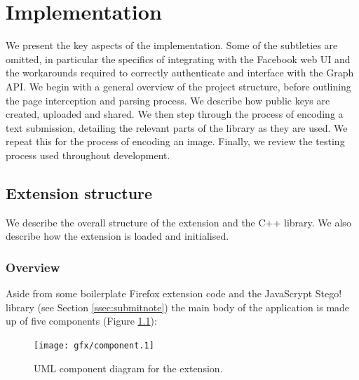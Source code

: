 \chapter{Implementation}\label{ch:implementation}
\label{imp}

We present the key aspects of the implementation. Some of the subtleties are omitted, in particular the specifics of integrating with the Facebook web UI and the workarounds required to correctly authenticate and interface with the Graph API. We begin with a general overview of the project structure, before outlining the page interception and parsing process. We describe how public keys are created, uploaded and shared. We then step through the process of encoding a text submission, detailing the relevant parts of the library as they are used. We repeat this for the process of encoding an image. Finally, we review the testing process used throughout development.


\FloatBarrier
\section{Extension structure}

We describe the overall structure of the extension and the C++ library. We also describe how the extension is loaded and initialised.

\subsection{Overview}
\label{ssec:over}

    Aside from some boilerplate Firefox extension code and the JavaScrypt Stego! library (see Section \ref{ssec:submitnote}) the main body of the application is made up of five components (Figure \ref{uml:component}):

    \begin{figure}[tb]
        \begin{center}
                \texttt{[image: gfx/component.1]}
            \caption{UML component diagram for the extension.}
            \label{uml:component}
        \end{center}
    \end{figure}
    
